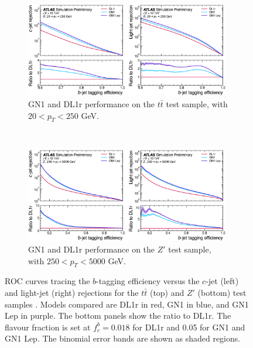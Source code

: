\begin{figure}[h!]
  \centering
  \begin{subfigure}[b]{0.98\textwidth}
      \centering
      \includegraphics[width=0.98\textwidth]{Images/FTAG/GN/GN1/ROC/ttb.png}
      \caption{GN1 and DL1r performance on the $t\bar{t}$ test sample, with $20 < p_T < 250$ GeV.} 
      \label{fig:GN1ttb}
  \end{subfigure}\\
  \begin{subfigure}[b]{0.98\textwidth}
    \centering %
      \includegraphics[width=0.98\textwidth]{Images/FTAG/GN/GN1/ROC/zpb.png}
      \caption{GN1 and DL1r performance on the $Z'$ test sample, with $250 < p_T < 5000$ GeV.} 
      \label{fig:GN1zpb}
  \end{subfigure}
  \caption{ROC curves tracing the $b$-tagging efficiency versus the $c$-jet (left) and light-jet (right) rejections for the $t\bar{t}$ (top) and $Z'$ (bottom) test samples \cite{ATL-PHYS-PUB-2022-027}. Models compared are DL1r in red, GN1 in blue, and GN1 Lep in purple. The bottom panels show the ratio to DL1r. The flavour fraction is set at $f^b_c = 0.018$ for DL1r and 0.05 for GN1 and GN1 Lep. The binomial error bands are shown as shaded regions.}
  \label{fig:GN1rocb}
\end{figure} 


